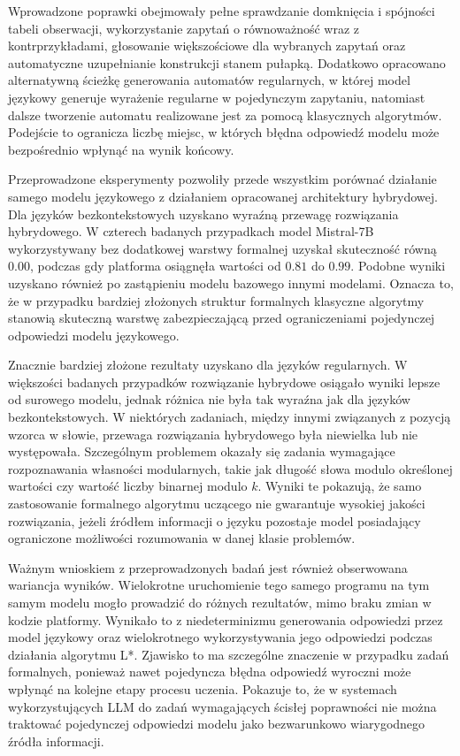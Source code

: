 \documentclass[12pt]{article}
\begin{document}
Wprowadzone poprawki obejmowały pełne sprawdzanie domknięcia i spójności tabeli obserwacji, wykorzystanie zapytań o równoważność wraz z kontrprzykładami, głosowanie większościowe dla wybranych zapytań oraz automatyczne uzupełnianie konstrukcji stanem pułapką. Dodatkowo opracowano alternatywną ścieżkę generowania automatów regularnych, w której model językowy generuje wyrażenie regularne w pojedynczym zapytaniu, natomiast dalsze tworzenie automatu realizowane jest za pomocą klasycznych algorytmów. Podejście to ogranicza liczbę miejsc, w których błędna odpowiedź modelu może bezpośrednio wpłynąć na wynik końcowy.

Przeprowadzone eksperymenty pozwoliły przede wszystkim porównać działanie samego modelu językowego z działaniem opracowanej architektury hybrydowej. Dla języków bezkontekstowych uzyskano wyraźną przewagę rozwiązania hybrydowego. W czterech badanych przypadkach model Mistral-7B wykorzystywany bez dodatkowej warstwy formalnej uzyskał skuteczność równą $0.00$, podczas gdy platforma osiągnęła wartości od $0.81$ do $0.99$. Podobne wyniki uzyskano również po zastąpieniu modelu bazowego innymi modelami. Oznacza to, że w przypadku bardziej złożonych struktur formalnych klasyczne algorytmy stanowią skuteczną warstwę zabezpieczającą przed ograniczeniami pojedynczej odpowiedzi modelu językowego.

Znacznie bardziej złożone rezultaty uzyskano dla języków regularnych. W większości badanych przypadków rozwiązanie hybrydowe osiągało wyniki lepsze od surowego modelu, jednak różnica nie była tak wyraźna jak dla języków bezkontekstowych. W niektórych zadaniach, między innymi związanych z pozycją wzorca w słowie, przewaga rozwiązania hybrydowego była niewielka lub nie występowała. Szczególnym problemem okazały się zadania wymagające rozpoznawania własności modularnych, takie jak długość słowa modulo określonej wartości czy wartość liczby binarnej modulo $k$. Wyniki te pokazują, że samo zastosowanie formalnego algorytmu uczącego nie gwarantuje wysokiej jakości rozwiązania, jeżeli źródłem informacji o języku pozostaje model posiadający ograniczone możliwości rozumowania w danej klasie problemów.

Ważnym wnioskiem z przeprowadzonych badań jest również obserwowana wariancja wyników. Wielokrotne uruchomienie tego samego programu na tym samym modelu mogło prowadzić do różnych rezultatów, mimo braku zmian w kodzie platformy. Wynikało to z niedeterminizmu generowania odpowiedzi przez model językowy oraz wielokrotnego wykorzystywania jego odpowiedzi podczas działania algorytmu L*. Zjawisko to ma szczególne znaczenie w przypadku zadań formalnych, ponieważ nawet pojedyncza błędna odpowiedź wyroczni może wpłynąć na kolejne etapy procesu uczenia. Pokazuje to, że w systemach wykorzystujących LLM do zadań wymagających ścisłej poprawności nie można traktować pojedynczej odpowiedzi modelu jako bezwarunkowo wiarygodnego źródła informacji.
\end{document}
